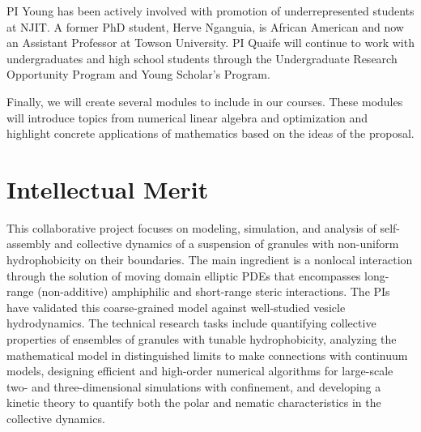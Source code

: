 PI Young has been actively involved with promotion of
underrepresented students at NJIT.  A former PhD student, Herve Nganguia, is African American and 
now an Assistant Professor at Towson University. 
PI Quaife will continue to work with undergraduates and high school
students through the Undergraduate Research Opportunity Program and
Young Scholar's Program.

Finally, we will
create several modules to include in our courses. These modules will
introduce topics from numerical linear algebra and optimization and
highlight concrete applications of mathematics based on the ideas of the
proposal.

\section{Intellectual Merit}
\label{sec:IntellectualMerit}
This collaborative project focuses on modeling, simulation, and analysis
of self-assembly and collective dynamics of a suspension of granules
with non-uniform hydrophobicity on their boundaries. The main ingredient
is a nonlocal interaction through the solution of moving domain elliptic
PDEs that encompasses long-range (non-additive) amphiphilic and
short-range steric interactions. The PIs have validated this
coarse-grained model against well-studied vesicle hydrodynamics. The
technical research tasks include quantifying collective properties of
ensembles of granules with tunable hydrophobicity, analyzing the
mathematical model in distinguished limits to make connections with
continuum models, designing efficient and high-order numerical
algorithms for large-scale two- and three-dimensional simulations with
confinement, and developing a kinetic theory to quantify both the polar
and nematic characteristics in the collective dynamics.

